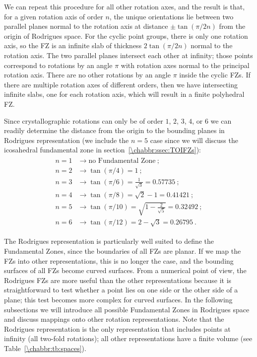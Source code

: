 We can repeat this procedure for all other rotation axes, and the result is that, for a given rotation axis of order $n$, the unique orientations lie between two parallel planes normal to the rotation axis at distance $\pm\tan(\pi/2n)$ from the origin of Rodrigues space.  For the cyclic point groups, there is only one rotation axis, so the FZ is an infinite slab of thickness $2\tan(\pi/2n)$ normal to the rotation axis. The two parallel planes intersect each other at infinity; those points correspond to rotations by an angle $\pi$ with rotation axes normal to the principal rotation axis. There are no other rotations by an angle $\pi$ inside the cyclic FZs.   If there are multiple rotation axes of different orders, then we have intersecting infinite slabs, one for each rotation axis, which will result in a finite polyhedral FZ. 

Since crystallographic rotations can only be of order $1$, $2$, $3$, $4$, or $6$ we can readily determine the distance from the origin to the bounding planes in Rodrigues representation (we include the $n=5$ case since we will discuss the icosahedral fundamental zone in section~\ref{\chabbr:ssec:TOIFZs}):
\begin{eqnarray}
\begin{split}
	n=1 &\rightarrow \text{no Fundamental Zone}\ ;\\
	n=2 &\rightarrow \tan(\pi/4) = 1\ ;\\
	n=3 &\rightarrow \tan(\pi/6) = \frac{1}{\sqrt{3}}= 0.57735\ ;\\
	n=4 &\rightarrow \tan(\pi/8) = \sqrt{2}-1  = 0.41421\ ;\\
	n=5 &\rightarrow \tan(\pi/10) = \sqrt{1-\frac{2}{\sqrt{5}}} = 0.32492\ ;\\
	n=6 &\rightarrow \tan(\pi/12) = 2-\sqrt{3} = 0.26795\ .
	\label{\chabbr:eq:tans}
\end{split}
\end{eqnarray}

The Rodrigues representation is particularly well suited to define the Fundamental Zones, since the boundaries of all FZs are planar. If we map the FZs into other representations, this is no longer the case, and the bounding surfaces of all FZs become curved surfaces.  From a numerical point of view, the Rodrigues FZs are more useful than the other representations because it is straightforward to test whether a point lies on one side or the other side of a plane; this test becomes more complex for curved surfaces.  In the following subsections we will introduce all possible Fundamental Zones in Rodrigues space and discuss mappings onto other rotation representations.  Note that the Rodrigues representation is the only representation that includes points at infinity (all two-fold rotations); all other representations have a finite volume (see Table~\ref{\chabbr:tb:spaces}). 


